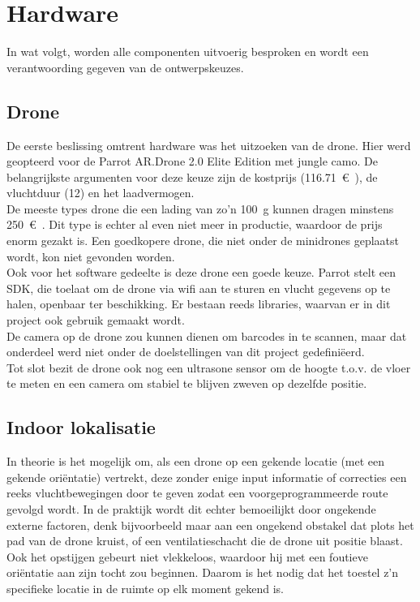 \chapter{Hardware}
In wat volgt, worden alle componenten uitvoerig besproken en wordt een verantwoording gegeven van de ontwerpskeuzes.

\section{Drone} \label{sec:drone}
De eerste beslissing omtrent hardware was het uitzoeken van de drone.
Hier werd geopteerd voor de Parrot AR.Drone 2.0 Elite Edition met jungle camo.
De belangrijkste argumenten voor deze keuze zijn de kostprijs (\SI{116.71}{\euro{}}), de vluchtduur (\SI{12}{\min}) en het laadvermogen.\\

De meeste types drone die een lading van zo'n \SI{100}{\g} kunnen dragen minstens \SI{250}{\euro{}}.
Dit type is echter al even niet meer in productie, waardoor de prijs enorm gezakt is.
Een goedkopere drone, die niet onder de minidrones geplaatst wordt, kon niet gevonden worden.\\

Ook voor het software gedeelte is deze drone een goede keuze. Parrot stelt een SDK, die toelaat om de drone via wifi aan te sturen en vlucht gegevens op te halen, openbaar ter beschikking.
Er bestaan reeds libraries, waarvan er in dit project ook gebruik gemaakt wordt.\\
De camera op de drone zou kunnen dienen om barcodes in te scannen, maar dat onderdeel werd niet onder de doelstellingen van dit project gedefini\"eerd.\\
Tot slot bezit de drone ook nog een ultrasone sensor om de hoogte t.o.v. de vloer te meten en een camera om stabiel te blijven zweven op dezelfde positie.

\section{Indoor lokalisatie}  \label{sec:uwb}
In theorie is het mogelijk om, als een drone op een gekende locatie (met een gekende ori\"entatie) vertrekt, deze zonder enige input informatie of correcties een reeks vluchtbewegingen door te geven zodat een voorgeprogrammeerde route gevolgd wordt. In de praktijk wordt dit echter bemoeilijkt door ongekende externe factoren, denk bijvoorbeeld maar aan een ongekend obstakel dat plots het pad van de drone kruist, of een ventilatieschacht die de drone uit positie blaast. Ook het opstijgen gebeurt niet vlekkeloos, waardoor hij met een foutieve ori\"entatie aan zijn tocht zou beginnen. Daarom is het nodig dat het toestel z'n specifieke locatie in de ruimte op elk moment gekend is.\\

